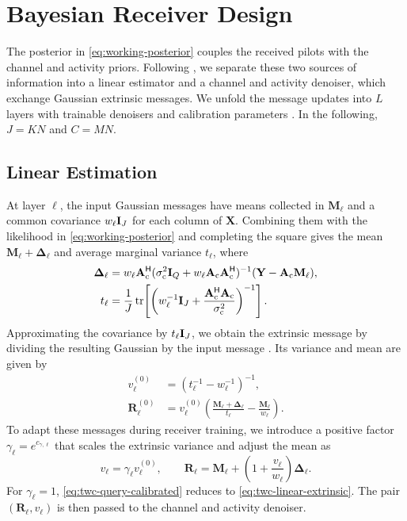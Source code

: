 \section{Bayesian Receiver Design}
\label{sec:algorithm}

The posterior in \eqref{eq:working-posterior} couples the received
pilots with the channel and activity priors. Following
\cite{cai2026}, we separate these two sources of information into a
linear estimator and a channel and activity denoiser, which exchange
Gaussian extrinsic messages. We unfold the message updates into $L$
layers with trainable denoisers and calibration parameters
\cite{wei2026}. In the following, $J=KN$ and $C=MN$.

\subsection{Linear Estimation}

At layer $\ell$, the input Gaussian messages have means collected in
$\mathbf M_\ell$ and a common covariance $w_\ell\mathbf{I}_J$ for each
column of $\mathbf X$. Combining them with the likelihood in
\eqref{eq:working-posterior} and completing the square gives the
mean $\mathbf M_\ell+\bm\Delta_\ell$ and average marginal variance
$t_\ell$, where
\begin{equation}
 \begin{aligned}
 \bm\Delta_\ell&=w_\ell\mathbf A_{\rm c}^{\mathsf H}
 (\sigma_{\rm c}^2\mathbf{I}_Q+w_\ell\mathbf A_{\rm c}\mathbf A_{\rm c}^{\mathsf H})^{-1}
 (\mathbf Y-\mathbf A_{\rm c}\mathbf M_\ell),
 \\
 t_\ell&=\frac1J\operatorname{tr}\!\left[
 \left(w_\ell^{-1}\mathbf{I}_J+
 \frac{\mathbf A_{\rm c}^{\mathsf H}\mathbf A_{\rm c}}{\sigma_{\rm c}^2}
 \right)^{-1}\right].
 \end{aligned}
 \label{eq:twc-linear-correction}
\end{equation}
Approximating the covariance by $t_\ell\mathbf{I}_J$, we obtain the
extrinsic message by dividing the resulting Gaussian by the input
message \cite{minka2001}. Its variance and mean are given by
\cite[eqs.~(10)--(11)]{cai2026}
\begin{equation}
 \begin{aligned}
 v_\ell^{(0)}&=(t_\ell^{-1}-w_\ell^{-1})^{-1},\\
 \mathbf R_\ell^{(0)}&=v_\ell^{(0)}
 \left(\frac{\mathbf M_\ell+\bm\Delta_\ell}{t_\ell}
       -\frac{\mathbf M_\ell}{w_\ell}\right).
 \end{aligned}
 \label{eq:twc-linear-extrinsic}
\end{equation}
To adapt these messages during receiver training, we introduce a
positive factor $\gamma_\ell=e^{c_{\gamma,\ell}}$ that scales the
extrinsic variance and adjust the mean as
\begin{equation}
 v_\ell=\gamma_\ell v_\ell^{(0)},\qquad
 \mathbf R_\ell=\mathbf M_\ell+
 \left(1+\frac{v_\ell}{w_\ell}\right)\bm\Delta_\ell.
 \label{eq:twc-query-calibrated}
\end{equation}
For $\gamma_\ell=1$, \eqref{eq:twc-query-calibrated} reduces to
\eqref{eq:twc-linear-extrinsic}. The pair
$(\mathbf R_\ell,v_\ell)$ is then passed to the channel and activity
denoiser.

